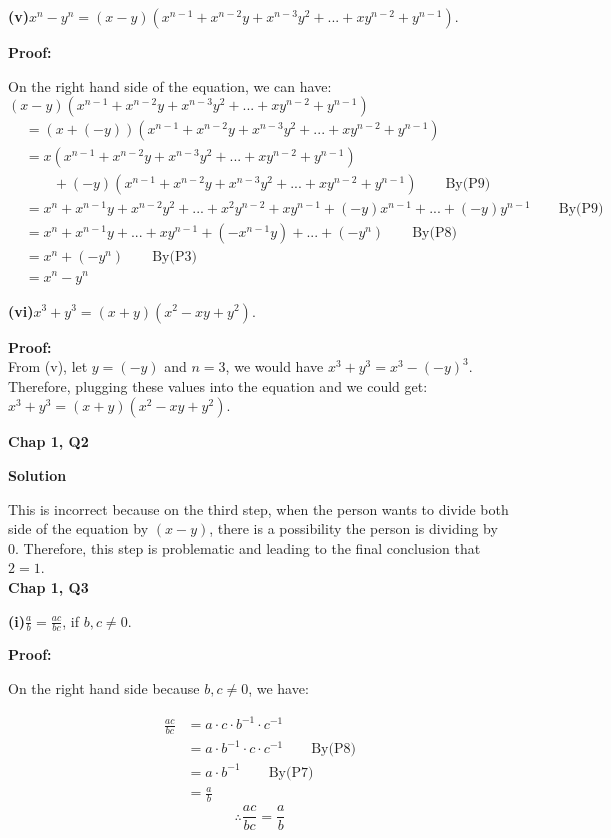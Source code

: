 \documentclass[a4paper,12pt]{report}
\begin{document}
\noindent
\textbf{(v)}$x^n-y^n=(x-y)(x^{n-1}+x^{n-2}y+x^{n-3}y^2+...+xy^{n-2}+y^{n-1})$.

\noindent
\textbf{Proof:}

\noindent
On the right hand side of the equation, we can have:\\
 \((x-y)(x^{n-1}+x^{n-2}y+x^{n-3}y^2+...+xy^{n-2}+y^{n-1})\)
 \begin{align*}
 &=(x+(-y))(x^{n-1}+x^{n-2}y+x^{n-3}y^2+...+xy^{n-2}+y^{n-1})\\
 &=x(x^{n-1}+x^{n-2}y+x^{n-3}y^2+...+xy^{n-2}+y^{n-1})\\
 &\qquad+(-y)(x^{n-1}+x^{n-2}y+x^{n-3}y^2+...+xy^{n-2}+y^{n-1})\qquad \text{By(P9)}\\
 &=x^n+x^{n-1}y+x^{n-2}y^2+...+x^2y^{n-2}+xy^{n-1}+(-y)x^{n-1}+...+(-y)y^{n-1}\qquad\text{By(P9)}\\
 &=x^n+x^{n-1}y+...+xy^{n-1}+(-x^{n-1}y)+...+(-y^n)\qquad\text{By(P8)}\\
 &=x^n+(-y^n)\qquad\text{By(P3)}\\
 &=x^n-y^n
 \end{align*}
 
\noindent
\textbf{(vi)}$x^3+y^3=(x+y)(x^2-xy+y^2)$.

\noindent
\textbf{Proof:}\\

\noindent
From (v), let $y=(-y) $ and $n=3$, we would have $x^3+y^3=x^3-(-y)^3$. Therefore, plugging these values into the equation and we could get: $x^3+y^3=(x+y)(x^2-xy+y^2)$. 

\noindent
\textbf{Chap 1, Q2} 

\noindent
\textbf{Solution}

\noindent
This is incorrect because on the third step, when the person wants to divide both side of the equation by $(x-y)$, there is a possibility the person is dividing by 0. Therefore, this step is problematic and leading to the final conclusion that $2=1$.\\

\noindent
\textbf{Chap 1, Q3} 

\noindent
\textbf{(i)}$\frac{a}{b}=\frac{ac}{bc}$, if $b,c\neq 0$.

\noindent
\textbf{Proof:}

\noindent
On the right hand side because $b,c\neq 0$, we have:

\begin{align*}
 \frac{ac}{bc} & = a\cdot{c}\cdot{b^{-1}}\cdot{c^{-1}}\\
 			   & = a\cdot{b^{-1}}\cdot{c}\cdot{c^{-1}}\qquad \text{By(P8)}\\
 			   & = a\cdot{b^{-1}}\qquad \text{By(P7)}\\
 			   & = \frac{a}{b}
\end{align*}
\[\therefore \frac{ac}{bc}=\frac{a}{b}\]
\end{document}
